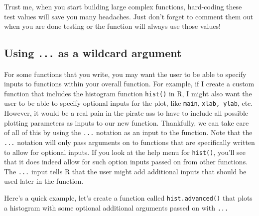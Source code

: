 \documentclass[]{book}
\theoremstyle{definition}
\theoremstyle{definition}
\theoremstyle{remark}
\begin{document}
Trust me, when you start building large complex functions, hard-coding
these test values will save you many headaches. Just don't forget to
comment them out when you are done testing or the function will always
use those values!

\subsection{\texorpdfstring{Using \texttt{...} as a wildcard
argument}{Using ... as a wildcard argument}}\label{using-...-as-a-wildcard-argument}

For some functions that you write, you may want the user to be able to
specify inputs to functions within your overall function. For example,
if I create a custom function that includes the histogram function
\texttt{hist()} in R, I might also want the user to be able to specify
optional inputs for the plot, like \texttt{main}, \texttt{xlab,\ ylab},
etc. However, it would be a real pain in the pirate ass to have to
include all possible plotting parameters as inputs to our new function.
Thankfully, we can take care of all of this by using the \texttt{...}
notation as an input to the function. Note that the \texttt{...}
notation will only pass arguments on to functions that are specifically
written to allow for optional inputs. If you look at the help menu for
\texttt{hist()}, you'll see that it does indeed allow for such option
inputs passed on from other functions. The \texttt{...} input tells R
that the user might add additional inputs that should be used later in
the function.

Here's a quick example, let's create a function called
\texttt{hist.advanced()} that plots a histogram with some optional
additional arguments passed on with \texttt{...}
\end{document}
